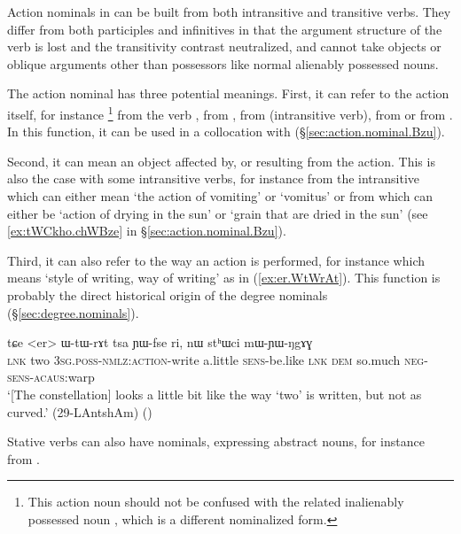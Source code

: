 Action nominals in  can be built from both intransitive and transitive verbs. They differ from both participles and infinitives in that the argument structure of the verb is lost and the transitivity contrast neutralized, and cannot take objects or oblique arguments other than possessors like normal alienably possessed nouns.


The action nominal has three potential meanings.  First, it can refer to the action itself, for instance \footnote{This action noun should not be confused with the related inalienably possessed noun , which is a different nominalized form. } from the verb ,  from ,  from  (intransitive verb),  from  or  from . In this function, it can be used in a collocation with  (§\ref{sec:action.nominal.Bzu}).

Second, it can mean an object affected by, or resulting from the action. This is also the case with some intransitive verbs, for instance  from the intransitive  which can either mean `the action of vomiting' or `vomitus' or  from  which can either be `action of drying in the sun' or `grain that are dried in the sun' (see \ref{ex:tWCkho.chWBze} in §\ref{sec:action.nominal.Bzu}).

Third, it can also refer to the way an action is performed, for instance  which means `style of writing, way of writing' as in (\ref{ex:er.WtWrAt}). This function is probably the direct historical origin of the degree nominals (§\ref{sec:degree.nominals}).

\begin{exe}
\ex \label{ex:er.WtWrAt}
\gll  tɕe <er> ɯ-tɯ-rɤt tsa ɲɯ-fse ri, nɯ stʰɯci mɯ-ɲɯ-ŋgɤɣ \\
\textsc{lnk} two \textsc{3sg}.\textsc{poss}-\textsc{nmlz}:\textsc{action}-write a.little \textsc{sens}-be.like \textsc{lnk} \textsc{dem} so.much \textsc{neg}-\textsc{sens}-\textsc{acaus}:warp \\
\glt `[The constellation] looks a little bit like the way `two' is written, but not as curved.' (29-LAntshAm)
()
\end{exe} 
 
Stative verbs can also have  nominals, expressing abstract nouns, for instance  from .


